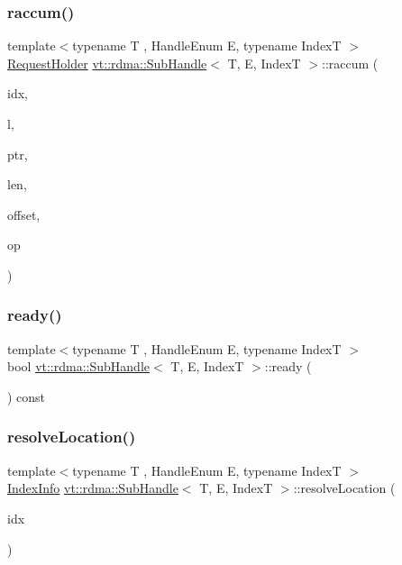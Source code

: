 \subsubsection{\texorpdfstring{raccum()}{raccum()}}
{\footnotesize\ttfamily template$<$typename T , Handle\+Enum E, typename IndexT $>$ \\
\hyperlink{structvt_1_1rdma_1_1_request_holder}{Request\+Holder} \hyperlink{structvt_1_1rdma_1_1_sub_handle}{vt\+::rdma\+::\+Sub\+Handle}$<$ T, E, IndexT $>$\+::raccum (\begin{DoxyParamCaption}\item[{IndexT const \&}]{idx,  }\item[{\hyperlink{namespacevt_1_1rdma_ac5c20b41a653e520b6305d4d454ecb70}{Lock}}]{l,  }\item[{T $\ast$}]{ptr,  }\item[{uint64\+\_\+t}]{len,  }\item[{int}]{offset,  }\item[{M\+P\+I\+\_\+\+Op}]{op }\end{DoxyParamCaption})}

\mbox{\label{structvt_1_1rdma_1_1_sub_handle_a554fae2fa1466135fe62d37ba8f9b6cf}} 
\subsubsection{\texorpdfstring{ready()}{ready()}}
{\footnotesize\ttfamily template$<$typename T , Handle\+Enum E, typename IndexT $>$ \\
bool \hyperlink{structvt_1_1rdma_1_1_sub_handle}{vt\+::rdma\+::\+Sub\+Handle}$<$ T, E, IndexT $>$\+::ready (\begin{DoxyParamCaption}{ }\end{DoxyParamCaption}) const\hspace{0.3cm}{\ttfamily [inline]}}

\mbox{\label{structvt_1_1rdma_1_1_sub_handle_aee0a3506044e6f6b569e553c66e26351}} 
\subsubsection{\texorpdfstring{resolve\+Location()}{resolveLocation()}}
{\footnotesize\ttfamily template$<$typename T , Handle\+Enum E, typename IndexT $>$ \\
\hyperlink{structvt_1_1rdma_1_1_index_info}{Index\+Info} \hyperlink{structvt_1_1rdma_1_1_sub_handle}{vt\+::rdma\+::\+Sub\+Handle}$<$ T, E, IndexT $>$\+::resolve\+Location (\begin{DoxyParamCaption}\item[{IndexT const \&}]{idx }\end{DoxyParamCaption})}

